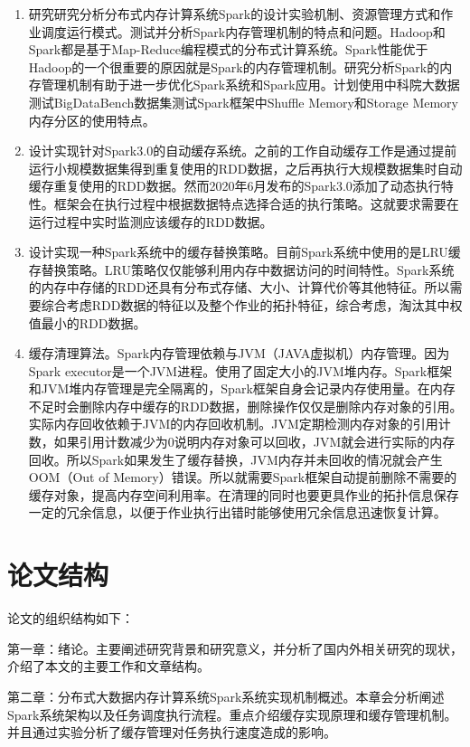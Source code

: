 \begin{enumerate}
    \item 研究研究分析分布式内存计算系统Spark的设计实验机制、资源管理方式和作业调度运行模式。测试并分析Spark内存管理机制的特点和问题。Hadoop和Spark都是基于Map-Reduce编程模式的分布式计算系统。Spark性能优于Hadoop的一个很重要的原因就是Spark的内存管理机制。研究分析Spark的内存管理机制有助于进一步优化Spark系统和Spark应用。计划使用中科院大数据测试BigDataBench数据集测试Spark框架中Shuffle Memory和Storage Memory内存分区的使用特点。
    \item 设计实现针对Spark3.0的自动缓存系统。之前的工作自动缓存工作是通过提前运行小规模数据集得到重复使用的RDD数据，之后再执行大规模数据集时自动缓存重复使用的RDD数据。然而2020年6月发布的Spark3.0添加了动态执行特性。框架会在执行过程中根据数据特点选择合适的执行策略。这就要求需要在运行过程中实时监测应该缓存的RDD数据。
    \item 设计实现一种Spark系统中的缓存替换策略。目前Spark系统中使用的是LRU缓存替换策略。LRU策略仅仅能够利用内存中数据访问的时间特性。Spark系统的内存中存储的RDD还具有分布式存储、大小、计算代价等其他特征。所以需要综合考虑RDD数据的特征以及整个作业的拓扑特征，综合考虑，淘汰其中权值最小的RDD数据。
    \item 缓存清理算法。Spark内存管理依赖与JVM（JAVA虚拟机）内存管理。因为Spark executor是一个JVM进程。使用了固定大小的JVM堆内存。Spark框架和JVM堆内存管理是完全隔离的，Spark框架自身会记录内存使用量。在内存不足时会删除内存中缓存的RDD数据，删除操作仅仅是删除内存对象的引用。实际内存回收依赖于JVM的内存回收机制。JVM定期检测内存对象的引用计数，如果引用计数减少为0说明内存对象可以回收，JVM就会进行实际的内存回收。所以Spark如果发生了缓存替换，JVM内存并未回收的情况就会产生OOM（Out of Memory）错误。所以就需要Spark框架自动提前删除不需要的缓存对象，提高内存空间利用率。在清理的同时也要更具作业的拓扑信息保存一定的冗余信息，以便于作业执行出错时能够使用冗余信息迅速恢复计算。
\end{enumerate}

\section{论文结构}

论文的组织结构如下：

第一章：绪论。主要阐述研究背景和研究意义，并分析了国内外相关研究的现状，介绍了本文的主要工作和文章结构。

第二章：分布式大数据内存计算系统Spark系统实现机制概述。本章会分析阐述Spark系统架构以及任务调度执行流程。重点介绍缓存实现原理和缓存管理机制。并且通过实验分析了缓存管理对任务执行速度造成的影响。

